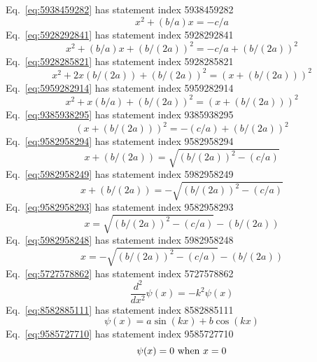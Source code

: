 \documentclass[12pt]{report}
\newcommand{\when}[1]{{\rm \ when\ }#1}
\begin{document}
Eq.~\ref{eq:5938459282} has statement index 5938459282
\begin{equation}
x^2 + (b/a)x = -c/a
\label{eq:5938459282}
\end{equation}
Eq.~\ref{eq:5928292841} has statement index 5928292841
\begin{equation}
x^2 + (b/a)x + (b/(2a))^2 = -c/a + (b/(2a))^2
\label{eq:5928292841}
\end{equation}
Eq.~\ref{eq:5928285821} has statement index 5928285821
\begin{equation}
x^2 + 2x(b/(2a)) + (b/(2a))^2 = (x+(b/(2a)))^2
\label{eq:5928285821}
\end{equation}
Eq.~\ref{eq:5959282914} has statement index 5959282914
\begin{equation}
x^2 + x(b/a) + (b/(2a))^2 = (x+(b/(2a)))^2
\label{eq:5959282914}
\end{equation}
Eq.~\ref{eq:9385938295} has statement index 9385938295
\begin{equation}
(x+(b/(2a)))^2 = -(c/a) + (b/(2a))^2
\label{eq:9385938295}
\end{equation}
Eq.~\ref{eq:9582958294} has statement index 9582958294
\begin{equation}
x+(b/(2a)) =  \sqrt{(b/(2a))^2 - (c/a)}
\label{eq:9582958294}
\end{equation}
Eq.~\ref{eq:5982958249} has statement index 5982958249
\begin{equation}
x+(b/(2a)) = -\sqrt{(b/(2a))^2 - (c/a)}
\label{eq:5982958249}
\end{equation}
Eq.~\ref{eq:9582958293} has statement index 9582958293
\begin{equation}
x =  \sqrt{(b/(2a))^2 - (c/a)}-(b/(2a))
\label{eq:9582958293}
\end{equation}
Eq.~\ref{eq:5982958248} has statement index 5982958248
\begin{equation}
x = -\sqrt{(b/(2a))^2 - (c/a)}-(b/(2a))
\label{eq:5982958248}
\end{equation}
Eq.~\ref{eq:5727578862} has statement index 5727578862
\begin{equation}
\frac{d^2}{dx^2} \psi(x) = -k^2 \psi(x)
\label{eq:5727578862}
\end{equation}
Eq.~\ref{eq:8582885111} has statement index 8582885111
\begin{equation}
\psi(x) = a \sin(kx) + b \cos(kx)
\label{eq:8582885111}
\end{equation}
Eq.~\ref{eq:9585727710} has statement index 9585727710
\begin{equation}
\psi(x)=0\when{x=0}
\label{eq:9585727710}
\end{equation}
\end{document}
